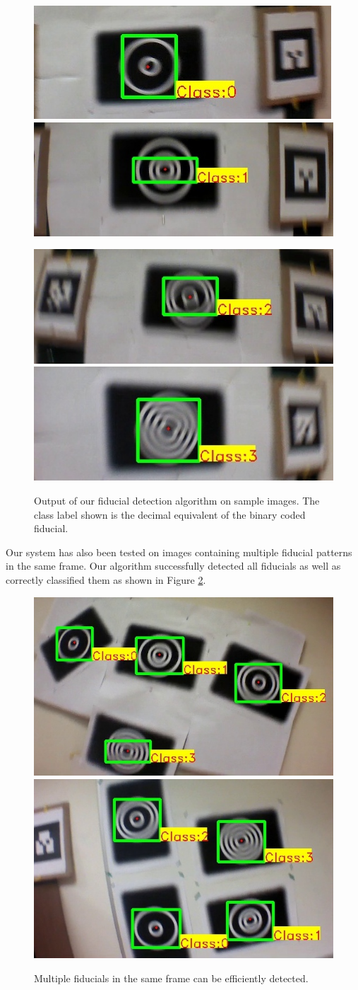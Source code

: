 \documentclass[10pt,twocolumn,letterpaper]{article}
\begin{document}
\begin{figure}[h!]
\centering
  \includegraphics[width=0.4\linewidth]{images/output_00.jpg}
  \includegraphics[width=0.4\linewidth]{images/output_01.jpg}

  \includegraphics[width=0.4\linewidth]{images/output_10.jpg}
  \includegraphics[width=0.4\linewidth]{images/output_11.jpg}
  \caption{Output of our fiducial detection algorithm on sample images. The
  class label shown is the decimal equivalent of the binary coded fiducial.}
  \label{fig:out_outputs}
\end{figure}

Our system has also been tested on images containing multiple fiducial
patterns in the same frame. Our algorithm successfully detected
all fiducials as well as correctly classified them as shown in
Figure \ref{fig:output_all}.

\begin{figure}[ht!]
\centering
  \includegraphics[width=.45\linewidth]{images/output_all_2.jpg}
  \includegraphics[width=.45\linewidth]{images/new_results/output_test_all1.jpg}
  \caption{Multiple fiducials in the same frame can be efficiently
    detected. }
  \label{fig:output_all}
\end{figure}
\end{document}
